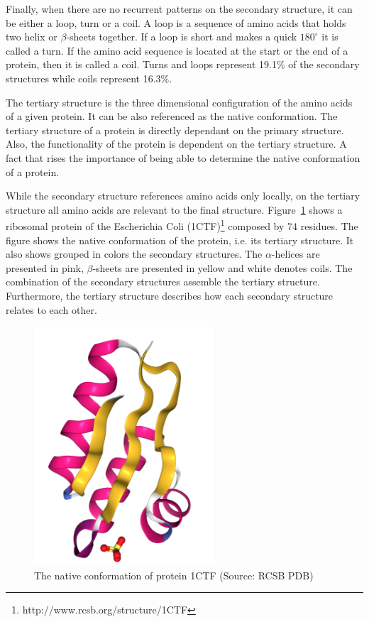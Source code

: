 Finally, when there are no recurrent patterns on the secondary structure, it
can be either a loop, turn or a coil. A loop is a sequence of amino acids that
holds two helix or $\beta$-sheets together. If a loop is short and makes a
quick $180^\circ$ it is called a turn. If the amino acid sequence is located at
the start or the end of a protein, then it is called a coil. Turns and loops
represent 19.1\% of the secondary structures while coils represent 16.3\%.

The tertiary structure is the three dimensional configuration of the amino
acids of a given protein. It can be also referenced as the native conformation.
The tertiary structure of a protein is directly dependant on the primary
structure. Also, the functionality of the protein is dependent on the tertiary
structure. A fact that rises the importance of being able to determine the
native conformation of a protein.

While the secondary structure references amino acids only locally, on the
tertiary structure all amino acids are relevant to the final structure.
Figure~\ref{fig:1ctf} shows a ribosomal protein of the Escherichia Coli
(1CTF)\footnote{http://www.rcsb.org/structure/1CTF} composed by 74 residues.
The figure shows the native conformation of the protein, i.e. its tertiary
structure. It also shows grouped in colors the secondary structures. The
$\alpha$-helices are presented in pink, $\beta$-sheets are presented in yellow
and white denotes coils. The combination of the secondary structures assemble
the tertiary structure. Furthermore, the tertiary structure describes how each
secondary structure relates to each other.

\begin{figure}[htbp]
    \centering
    \includegraphics[angle=90,origin=c,width=0.6\textwidth]{Figuras/1ctf.png}
    \caption{The native conformation of protein 1CTF (Source: RCSB PDB)}
    \label{fig:1ctf}
\end{figure}

